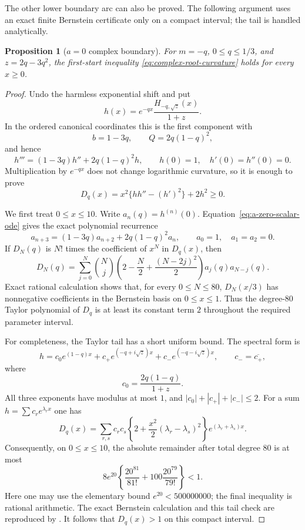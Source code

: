 \documentclass[11pt]{article}
\newtheorem{proposition}[theorem]{Proposition}
\theoremstyle{remark}
\begin{document}
The other lower boundary arc can also be proved.  The following argument uses
an exact finite Bernstein certificate only on a compact interval; the tail is
handled analytically.
\begin{proposition}[$a=0$ complex boundary]
\label{prop:first-a-zero}
For $m=-q$, $0\leq q\leq1/3$, and
$z=2q-3q^2$, the first-start inequality
\eqref{eq:complex-root-curvature} holds for every $x\geq0$.
\end{proposition}
\begin{proof}
Undo the harmless exponential shift and put
\[
 h(x)=e^{-qx}\frac{H_{-q,\sqrt z}(x)}{1+z}.
\]
In the ordered canonical coordinates this is the first component with
\[
 b=1-3q,\qquad Q=2q(1-q)^2,
\]
and hence
\begin{equation}\label{eq:a-zero-scalar-ode}
 h'''=(1-3q)h''+2q(1-q)^2h,
 \qquad h(0)=1,\quad h'(0)=h''(0)=0.
\end{equation}
Multiplication by $e^{-qx}$ does not change logarithmic curvature, so it is
enough to prove
\[
 D_q(x)=x^2\{hh''-(h')^2\}+2h^2\geq0.
\]

We first treat $0\leq x\leq10$.  Write
$a_n(q)=h^{(n)}(0)$.  Equation~\eqref{eq:a-zero-scalar-ode} gives the exact
polynomial recurrence
\[
 a_{n+3}=(1-3q)a_{n+2}+2q(1-q)^2a_n,
 \qquad a_0=1,\quad a_1=a_2=0.
\]
If $D_N(q)$ is $N!$ times the coefficient of $x^N$ in $D_q(x)$, then
\[
 D_N(q)=\sum_{j=0}^N\binom Nj
 \left(2-\frac N2+\frac{(N-2j)^2}{2}\right)
 a_j(q)a_{N-j}(q).
\]
Exact rational calculation shows that, for every $0\leq N\leq80$,
$D_N(x/3)$ has nonnegative coefficients in the Bernstein basis on
$0\leq x\leq1$.  Thus the degree-$80$ Taylor polynomial of $D_q$ is at
least its constant term $2$ throughout the required parameter interval.

For completeness, the Taylor tail has a short uniform bound.  The spectral
form is
\begin{equation}\label{eq:a-zero-spectral-form}
 h=c_0e^{(1-q)x}+c_+e^{(-q+i\sqrt z)x}
   +c_-e^{(-q-i\sqrt z)x},
 \qquad c_-=\overline{c_+},
\end{equation}
where
\[
 c_0=\frac{2q(1-q)}{1+z}.
\]
All three exponents have modulus at most $1$, and
$|c_0|+|c_+|+|c_-|\leq2$.  For a sum
$h=\sum c_re^{\lambda_rx}$ one has
\[
 D_q(x)=\sum_{r,s}c_rc_s
 \left\{2+\frac{x^2}{2}(\lambda_r-\lambda_s)^2\right\}
 e^{(\lambda_r+\lambda_s)x}.
\]
Consequently, on $0\leq x\leq10$, the absolute remainder after total degree
$80$ is at most
\[
 8e^{20}\left\{\frac{20^{81}}{81!}
 +100\frac{20^{79}}{79!}\right\}<1.
\]
Here one may use the elementary bound $e^{20}<500000000$; the final
inequality is rational arithmetic.  The exact Bernstein calculation and
this tail check are reproduced by
.  It follows that
$D_q(x)>1$ on this compact interval.


\end{proof}
\end{document}
